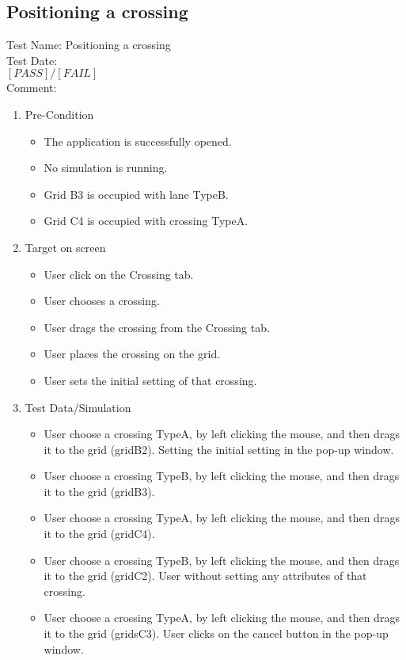 \subsection{Positioning a crossing}
Test Name: Positioning a crossing\\Test Date: \\ $\left[ PASS \right] / \left[ FAIL \right]$\\Comment: \\
\begin{enumerate}
	\item Pre-Condition
	\begin{itemize}
		\item The application is successfully opened.
		\item No simulation is running.
		\item Grid B3 is occupied with lane TypeB.
		\item Grid C4 is occupied with crossing TypeA.
	\end{itemize}
	\item Target on screen
	\begin{itemize}
		\item User click on the Crossing tab.
		\item User chooses a crossing.
		\item User drags the crossing from the Crossing tab.
		\item User places the crossing on the grid.
		\item User sets the initial setting of that crossing.
	\end{itemize}
	\item Test Data/Simulation
	\begin{itemize}
		\item User choose a crossing TypeA, by left clicking the mouse, and then drags it to the grid (gridB2). Setting the initial setting in the pop-up window.
		\item User choose a crossing TypeB, by left clicking the mouse, and then drags it to the grid (gridB3).
		\item User choose a crossing TypeA, by left clicking the mouse, and then drags it to the grid (gridC4).
		\item User choose a crossing TypeB, by left clicking the mouse, and then drags it to the grid (gridC2). User without setting any attributes of that crossing.
		\item User choose a crossing TypeA, by left clicking the mouse, and then drags it to the grid (gridsC3). User clicks on the cancel button in the pop-up window.

\end{itemize}
\end{enumerate}
